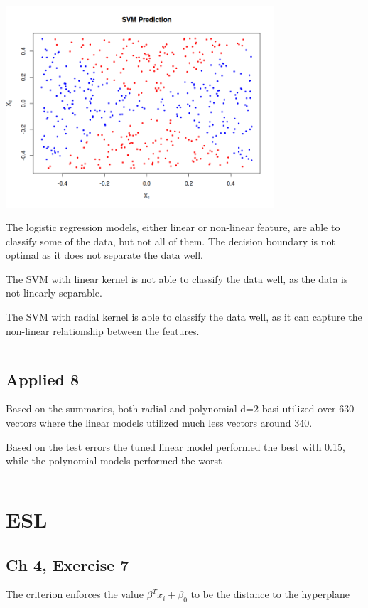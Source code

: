 \documentclass{article}
\begin{document}
\newline
\includegraphics[width=0.75\textwidth]{figs/q5-5.png}
\newline


The logistic regression models, either linear or non-linear feature, are able to classify some of the data, but not all of them. The decision boundary is not optimal as it does not separate the data well.

The SVM with linear kernel is not able to classify the data well, as the data is not linearly separable.

The SVM with radial kernel is able to classify the data well, as it can capture the non-linear relationship between the features.

\inputminted{r}{src/q5.R}
\newpage
\subsection{Applied 8}

Based on the summaries, both radial and polynomial d=2 basi utilized over 630 vectors where the linear models utilized much less vectors around 340.

Based on the test errors the tuned linear model performed the best with 0.15, while the polynomial models performed the worst

\inputminted{r}{src/q8.R}

\newpage
\section{ESL}
\subsection{Ch 4, Exercise 7}
The criterion enforces the value \(\beta^T x_i + \beta_0\) to be the distance to the hyperplane
\end{document}
